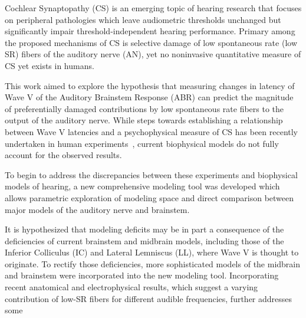Cochlear Synaptopathy (CS) is an emerging topic of hearing research that focuses on peripheral pathologies which leave audiometric thresholds unchanged but significantly impair threshold-independent hearing performance. Primary among the proposed mechanisms of CS is selective damage of low spontaneous rate (low SR) fibers of the auditory nerve (AN), yet no noninvasive quantitative measure of CS yet exists in humans.

This work aimed to explore the hypothesis that measuring changes in latency of Wave V of the Auditory Brainstem Response (ABR) can predict the magnitude of preferentially damaged contributions by low spontaneous rate fibers to the output of the auditory nerve. While steps towards establishing a relationship between Wave V latencies and a psychophysical measure of CS has been recently undertaken in human experiments~\cite{Mehraei2016Auditory}, current biophysical models do not fully account for the observed results.

To begin to address the discrepancies between these experiments and biophysical models of hearing, a new comprehensive modeling tool was developed which allows parametric exploration of modeling space and direct comparison between major models of the auditory nerve and brainstem. 

It is hypothesized that modeling deficits may be in part a consequence of the deficiencies of current brainstem and midbrain models, including those of the Inferior Colliculus (IC) and Lateral Lemniscus (LL), where Wave V is thought to originate.  To rectify those deficiencies, more sophisticated models of the midbrain and brainstem were incorporated into the new modeling tool. Incorporating recent anatomical and electrophysical results, which suggest a varying contribution of low-SR fibers for different audible frequencies, further addresses some 
